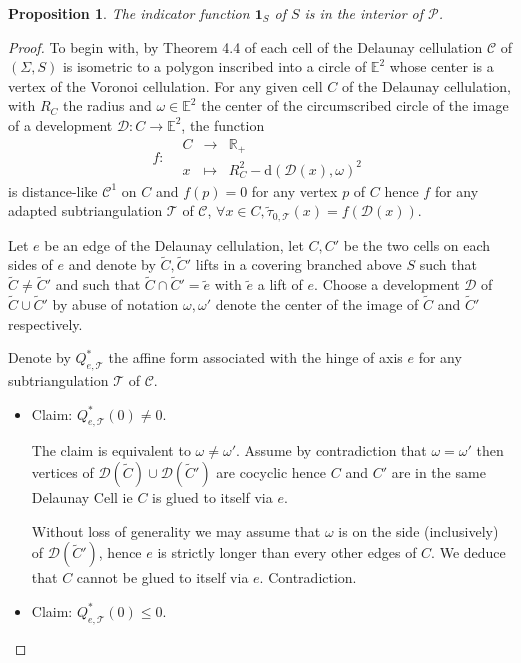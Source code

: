 \documentclass[a4paper,12pt]{article}
\def\D{\mathcal{D}}
\def\TT{\mathcal T}
\def\E{\mathbf E}
\def\adm{\P}
\def\d{\mathrm{d}}
\def\D{\mathcal{D}}
\def\E{\mathbb{E}}
\def\RR{\mathbb{R}}
\def\Cell{\mathcal C}
\def\E{\mathbb{E}}
\def\d{\mathrm{d}}
\def\D{\mathcal{D}}
\def\adm{\mathcal{P}}
\def\P{\mathcal{P}}
\newcommand{\function}[5]{\displaystyle#1:\begin{array}{l|rcl}
& \displaystyle #2 & \longrightarrow & \displaystyle #3 \\
	& \displaystyle #4 & \longmapsto & \displaystyle #5 \end{array}}
\newcommand{\tautilde}[2]{\widetilde\tau_{#1,#2}}
\newtheorem{prop}[lem]{Proposition}
\theoremstyle{definition}
\begin{document}
						
				\begin{prop}\label{prop:delaunay_interieur}
				 The indicator function $\mathbf{1}_S$ of $S$ is in the interior of $\adm$.
				\label{prop:penint}
				\end{prop}
				\begin{proof}
					To begin with, by Theorem 4.4 of \cite{MR1135877} each cell of the Delaunay cellulation $\Cell$ of $(\Sigma, S)$ is isometric to a polygon inscribed into a circle of $\E^2$ whose center is a vertex of the Voronoi cellulation.
					For any given cell $C$ of the Delaunay cellulation, with $R_C$ the radius and $\omega\in \E^2$ the center of the circumscribed circle of the image of a development $\D:C\rightarrow\E^2$, the function 
					$$\function{f}{C}{\RR_+}{x}{R_C^2-\d(\D(x),\omega)^2}$$
					is distance-like $\mathscr C^1$ on $C$ and $f(p)=0$ for any vertex $p$ of $C$ hence $f$ for any adapted subtriangulation $\TT$ of $\Cell$, $\forall x\in C,\tautilde{0}{\TT}(x)=f(\D(x))$. 
					
					Let $e$ be an edge of the Delaunay cellulation, let $C,C'$ be the two cells on each sides of $e$ and denote by $\widetilde C,\widetilde C'$ lifts in a covering branched above $S$ such that $\widetilde C\neq \widetilde C'$ and such that $\widetilde C\cap \widetilde C'=\widetilde e$ with $\widetilde  e$ a lift of $e$. Choose a development $\D$ of $\widetilde C\cup \widetilde C'$ by abuse of notation $\omega,\omega'$ denote the center of the image of 
					$\widetilde C$ and $ \widetilde C'$ respectively.
					
					Denote by $Q^*_{e,\TT}$ the affine form associated with the hinge of axis $e$ for any subtriangulation $\TT$ of $\Cell$.
					\begin{itemize}
					 \item Claim: $Q^*_{e,\TT}(0)\neq 0$.
					 
					  The claim is equivalent to $\omega\neq\omega'$.
					  Assume by contradiction that $\omega=\omega'$ then vertices of $\D(\widetilde C)\cup \D(\widetilde C')$ are cocyclic hence $C$ and $C'$ are in the same Delaunay Cell ie $C$ is glued to itself via $e$. 
					 
					 Without loss of generality we may assume that $\omega$ is on the side (inclusively) of $\D(\widetilde C')$, hence  $e$ is strictly longer than every other edges of $C$. We deduce that $C$ cannot be glued to itself via $e$. Contradiction.
					 
					 \item Claim: $Q^*_{e,\TT}(0)\leq 0$.
					 

\end{itemize}
\end{proof}
\end{document}
